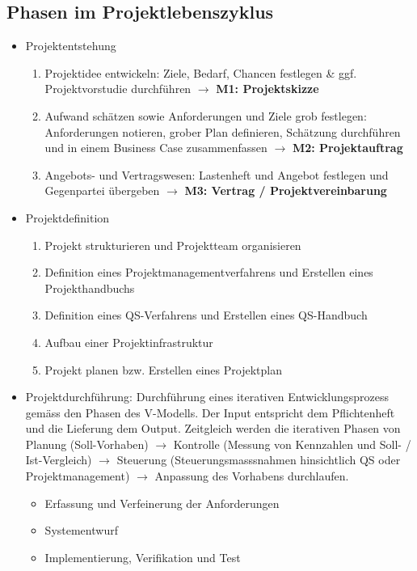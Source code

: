 \subsection{Phasen im Projektlebenszyklus}
\begin{itemize}
    \item Projektentstehung
    \begin{enumerate}
        \item Projektidee entwickeln: Ziele, Bedarf, Chancen festlegen \& ggf. Projektvorstudie durchführen \(\rightarrow\) \textbf{M1: Projektskizze}
        \item Aufwand schätzen sowie Anforderungen und Ziele grob festlegen: Anforderungen notieren, grober Plan definieren, Schätzung durchführen und in einem Business Case zusammenfassen \(\rightarrow\) \textbf{M2: Projektauftrag}
        \item Angebots- und Vertragswesen: Lastenheft und Angebot festlegen und Gegenpartei übergeben \(\rightarrow\) \textbf{M3: Vertrag / Projektvereinbarung}
    \end{enumerate}
    \item Projektdefinition
    \begin{enumerate}
        \item Projekt strukturieren und Projektteam organisieren
        \item Definition eines Projektmanagementverfahrens und Erstellen eines Projekthandbuchs
        \item Definition eines QS-Verfahrens und Erstellen eines QS-Handbuch
        \item Aufbau einer Projektinfrastruktur
        \item Projekt planen bzw. Erstellen eines Projektplan
    \end{enumerate}
    \item Projektdurchführung:
    Durchführung eines iterativen Entwicklungsprozess gemäss den Phasen des V-Modells. Der Input entspricht dem Pflichtenheft und die Lieferung dem Output. Zeitgleich werden die iterativen Phasen von Planung (Soll-Vorhaben) \(\rightarrow\) Kontrolle  (Messung von Kennzahlen und Soll- / Ist-Vergleich) \(\rightarrow\) Steuerung (Steuerungsmasssnahmen hinsichtlich QS oder Projektmanagement) \(\rightarrow\) Anpassung des Vorhabens durchlaufen.
    \begin{itemize}
        \item Erfassung und Verfeinerung der Anforderungen
        \item Systementwurf
        \item Implementierung, Verifikation und Test

\end{itemize}
\end{itemize}
